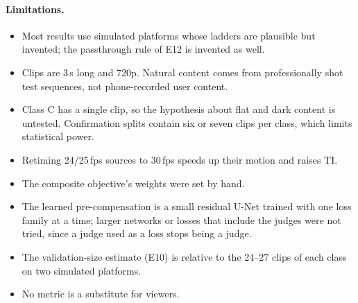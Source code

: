 \paragraph{Limitations.}
\begin{itemize}
  \item Most results use simulated platforms whose ladders are plausible but invented; the
        passthrough rule of E12 is invented as well.
  \item Clips are 3\,s long and 720p. Natural content comes from professionally shot test
        sequences, not phone-recorded user content.
  \item Class C has a single clip, so the hypothesis about flat and dark content is untested.
        Confirmation splits contain six or seven clips per class, which limits statistical power.
  \item Retiming 24/25\,fps sources to 30\,fps speeds up their motion and raises TI.
  \item The composite objective's weights were set by hand.
  \item The learned pre-compensation is a small residual U-Net trained with one loss family at a
        time; larger networks or losses that include the judges were not tried, since a judge used
        as a loss stops being a judge.
  \item The validation-size estimate (E10) is relative to the 24--27 clips of each class on two
        simulated platforms.
  \item No metric is a substitute for viewers. 
\end{itemize}
